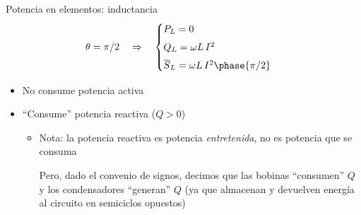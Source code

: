 \documentclass[aspectratio=169, usenames,svgnames,dvipsnames]{beamer}
\begin{document}
\begin{frame}{Potencia en elementos: \hspace{3mm}inductancia}
    \[
    \theta = \pi/2 \quad \Rightarrow \quad
    \begin{cases}
      P_L = 0\\[4pt]
      Q_L = \omega L\, I^2\\[4pt]
      \overline{S}_L = \omega L\, I^2 \phase{\pi/2}
    \end{cases}
    \]
    
    \begin{itemize}
        \item No consume potencia activa

        \vspace{2mm}
        \item ``Consume'' potencia reactiva (\(Q > 0\))
        
        \vspace{2mm}
        \begin{itemize}
            \item {\normalsize \alert{Nota}: la potencia reactiva es potencia \textit{entretenida}, no es potencia que se consuma}

            \vspace{2mm}
            {\normalsize Pero, dado el convenio de signos, decimos que \alert{las bobinas ``consumen'' $Q$} y \alert{los condensadores ``generan'' $Q$} (ya que almacenan y devuelven energía al circuito en semiciclos opuestos)}
        \end{itemize}
    \end{itemize}
\end{frame}

\end{document}
